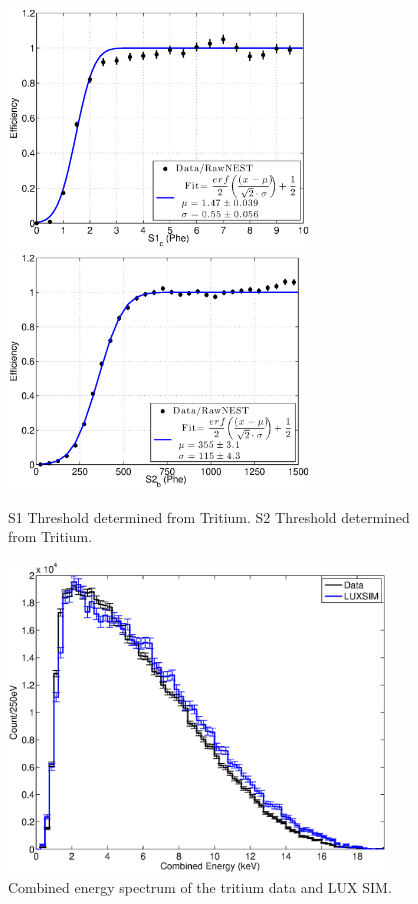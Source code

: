 \begin{figure}[h!]\centering
\includegraphics[width=80mm]{CH3T_eff_S1_100_T_paper_corr_threshold.eps}
\includegraphics[width=80mm]{CH3T_eff_S2_100_T_paper_corr_threshold.eps}
\caption{S1 Threshold determined from Tritium. S2 Threshold determined from Tritium.}
\label{fig:S1S2_Thresh}
\end{figure}



\begin{figure}[h!]\centering
\includegraphics[width=100mm]{CH3T_E_spec_18_Tritium_Dec_2013_180.eps}
\caption{Combined energy spectrum of the tritium data and LUX SIM.}
\label{fig:E_spec}
\end{figure}
 
